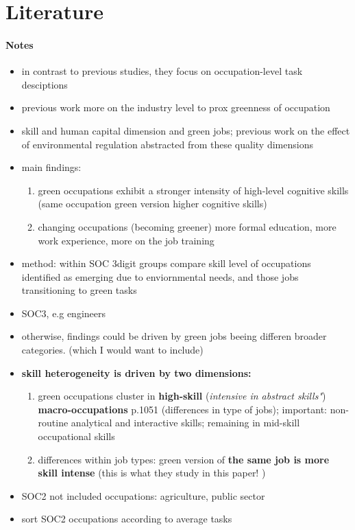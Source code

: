 \section{Literature}
\paragraph{Notes \cite{Consoli2016DoCapital}}
\begin{itemize}
	\item in contrast to previous studies, they focus on occupation-level task desciptions
	\item previous work more on the industry level to prox greenness of occupation 
	\item skill and human capital dimension and green jobs; previous work on the effect of environmental regulation abstracted from these quality dimensions
	\item main findings:
	\begin{enumerate}
		\item green occupations exhibit a stronger intensity of high-level cognitive skills (\ar same occupation green version higher cognitive skills)
		\item changing occupations (becoming greener) more formal education, more work experience, more on the job training
	\end{enumerate}
\item method: within SOC 3digit groups compare skill level of occupations identified as emerging due to enviornmental needs, and those jobs transitioning to green tasks
\item SOC3, e.g engineers
\item otherwise, findings could be driven by green jobs beeing differen broader categories. (which I would want to include)
\item \textbf{skill heterogeneity is driven by two dimensions: }
\begin{enumerate}
	\item green occupations cluster in \textbf{high-skill} (\textit{intensive in abstract skills"}) \textbf{macro-occupations} p.1051 (\ar differences in type of jobs); important: non-routine analytical and interactive skills; remaining in mid-skill occupational skills
	\item differences within job types: green version of \textbf{the same job is more skill intense} (this is what they study in this paper! )
\end{enumerate}
\item SOC2 not included occupations: agriculture, public sector
\item sort SOC2 occupations according to average tasks



\end{itemize}
